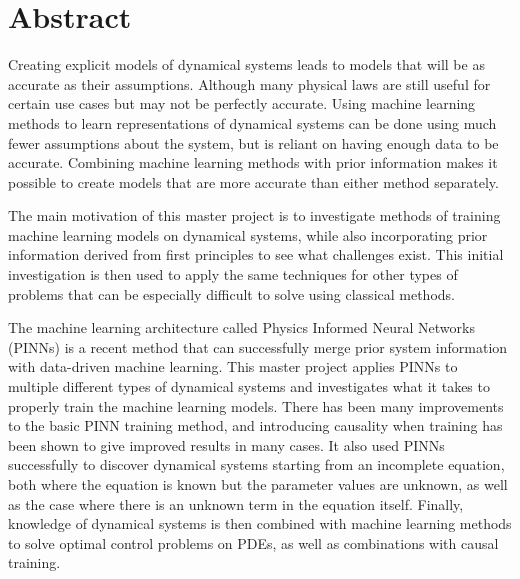 \chapter*{Abstract}

Creating explicit models of dynamical systems leads to models that will be as accurate as their assumptions. Although many physical laws are still useful for certain use cases but may not be perfectly accurate. Using machine learning methods to learn representations of dynamical systems can be done using much fewer assumptions about the system, but is reliant on having enough data to be accurate. Combining machine learning methods with prior information makes it possible to create models that are more accurate than either method separately.

The main motivation of this master project is to investigate methods of training machine learning models on dynamical systems, while also incorporating prior information derived from first principles to see what challenges exist. This initial investigation is then used to apply the same techniques for other types of problems that can be especially difficult to solve using classical methods.

The machine learning architecture called Physics Informed Neural Networks (PINNs) is a recent method that can successfully merge prior system information with data-driven machine learning. This master project applies PINNs to multiple different types of dynamical systems and investigates what it takes to properly train the machine learning models. There has been many improvements to the basic PINN training method, and introducing causality when training has been shown to give improved results in many cases. It also used PINNs successfully to discover dynamical systems starting from an incomplete equation, both where the equation is known but the parameter values are unknown, as well as the case where there is an unknown term in the equation itself. Finally, knowledge of dynamical systems is then combined with machine learning methods to solve optimal control problems on PDEs, as well as combinations with causal training.